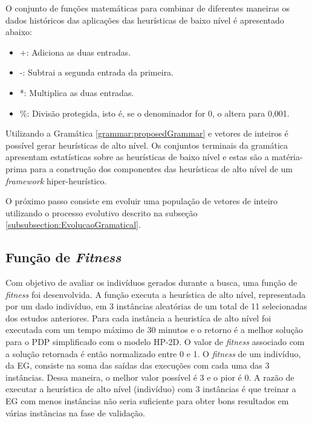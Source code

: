  
  
  O conjunto de funções matemáticas para combinar de diferentes maneiras os dados históricos das aplicações das heurísticas de baixo nível é apresentado abaixo:
  
  \begin{itemize}
  	\item +: Adiciona as duas entradas.
  	\item -: Subtrai a segunda entrada da primeira.
  	\item *: Multiplica as duas entradas.
  	\item \%: Divisão protegida, isto é, se o denominador for 0, o altera para 0,001.
  \end{itemize}
  
  
  Utilizando a Gramática \ref{grammar:proposedGrammar} e vetores de inteiros é possível gerar heurísticas de alto nível. Os conjuntos terminais da gramática apresentam estatísticas sobre as heurísticas de baixo nível e estas são a matéria-prima para a construção dos componentes das heurísticas de alto nível de um \textit{framework} hiper-heurístico. 
  
  

  
  O próximo passo consiste em evoluir uma população de vetores de inteiro utilizando o processo evolutivo descrito na subseção 
  \ref{subsubsection:EvolucaoGramatical}. %
  
  
  \subsection{Função de \textit{Fitness}}
  \label{sub:funcfitness}
  
  
  	
 Com objetivo de avaliar os indivíduos gerados durante a busca, uma função de \textit{fitness} foi desenvolvida. A função executa a heurística de alto nível, representada por um dado indivíduo, em 3 instâncias aleatórias de um total de 11 selecionadas dos estudos anteriores. Para cada instância a heuristíca de alto nível foi executada com um tempo máximo de 30 minutos e o retorno é a melhor solução para o PDP simplificado com o modelo HP-2D. O valor de \textit{fitness} associado com a solução retornada é então normalizado entre 0 e 1. O \textit{fitness} de um indivíduo, da EG, consiste na soma das saídas das execuções com cada uma das 3 instâncias. Dessa maneira, o melhor valor possível é 3 e o pior é 0. A razão de executar a heurística de alto nível (indivíduo) com 3 instâncias é que treinar a EG com menos instâncias não seria suficiente para obter bons resultados em várias instâncias na fase de validação. 
 
